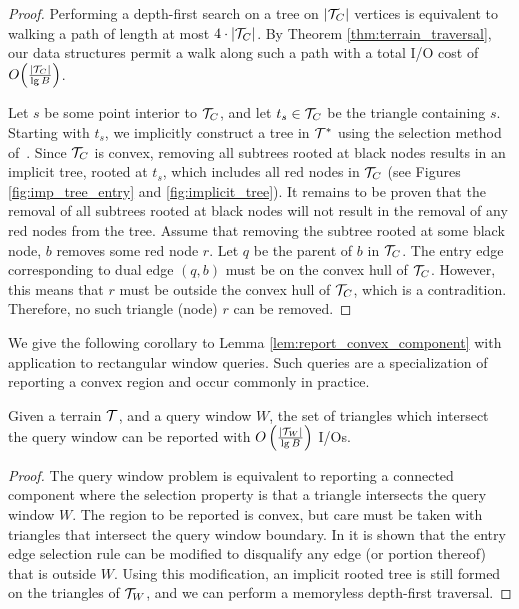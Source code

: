   \begin{proof}
  Performing a depth-first search on a tree on $|\mathcal{T}_C|$ vertices is equivalent 
  to walking a path of length at most $4 \cdot |\mathcal{T}_C|$.
  By Theorem \ref{thm:terrain_traversal}, our data structures permit a walk along 
  such a path with a total I/O cost of $O\!\left( \frac{|\mathcal{T}_C|}{\lg{B}} \right)$.

  Let $s$ be some point interior to $\mathcal{T}_C$, and let $t_s \in \mathcal{T}_C$ be
  the triangle containing $s$.
  Starting with $t_s$, we implicitly construct a tree in $\mathcal{T}^*$ using the 
  selection method of~\cite{deberg_et_al_1997}.
  Since $\mathcal{T}_C$ is convex, removing all subtrees rooted at black nodes results 
  in an implicit tree, rooted at $t_s$, which includes all red nodes in $\mathcal{T}_C$
  (see Figures \ref{fig:imp_tree_entry} and \ref{fig:implicit_tree}).
  It remains to be proven that the removal of all subtrees rooted at black nodes
  will not result in the removal of any red nodes from the tree.
  Assume that removing the subtree rooted at some black node, $b$ removes some
  red node $r$. 
  Let $q$ be the parent of $b$ in $\mathcal{T}_C$. 
  The entry edge corresponding to dual edge $(q,b)$ must be on the convex
  hull of $\mathcal{T}_C$.
  However, this means that $r$ must be outside the convex hull of $\mathcal{T}_C$, which
  is a contradition. 
  Therefore, no such triangle (node) $r$ can be removed.
  \end{proof}
  
  We give the following corollary to Lemma \ref{lem:report_convex_component}
  with application to rectangular window queries.
  Such queries are a specialization of reporting a convex region 
  and occur commonly in practice.

  \begin{corollary}\label{cor:window_query}
  Given a terrain $\mathcal{T}$, and a query window $W$, the set of 
  triangles which intersect the query window can be 
  reported with $O \left( \frac{|\mathcal{T}_W|}{\lg{B}} \right)$ I/Os. 
  \end{corollary}

  \begin{proof}
  The query window problem is equivalent to reporting 
  a connected component where the selection property is that a triangle 
  intersects the query window $W$. 
  The region to be reported is convex, but care must be taken with 
  triangles that intersect the query window boundary. 
  In \cite{deberg_et_al_1997} it is shown that the entry edge selection 
  rule can be modified to disqualify any edge (or portion thereof) that 
  is outside $W$. 
  Using this modification, an implicit rooted tree is still formed on 
  the triangles of $\mathcal{T}_W$, and we can perform a memoryless 
  depth-first traversal.
  \end{proof}

